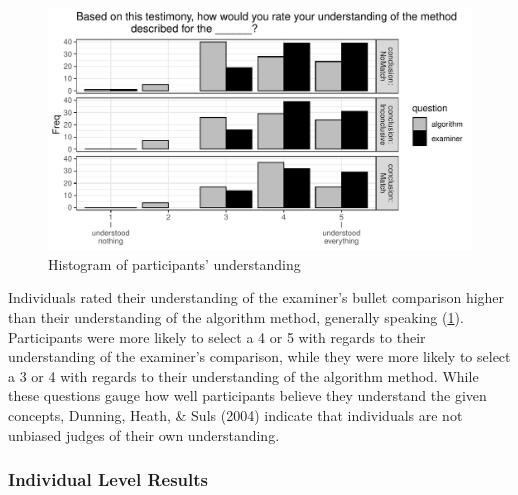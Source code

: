 \documentclass[print]{nuthesis}
\begin{document}
\begin{figure}

{\centering \includegraphics[width=\linewidth]{thesis_files/figure-latex/histunder-1} 

}

\caption{Histogram of participants' understanding}\label{fig:histunder}
\end{figure}

Individuals rated their understanding of the examiner's bullet comparison higher than their understanding of the algorithm method, generally speaking (\ref{fig:histunder}).
Participants were more likely to select a 4 or 5 with regards to their understanding of the examiner's comparison, while they were more likely to select a 3 or 4 with regards to their understanding of the algorithm method.
While these questions gauge how well participants believe they understand the given concepts, Dunning, Heath, \& Suls (2004) indicate that individuals are not unbiased judges of their own understanding.

\hypertarget{individual-level-results}{%
\subsubsection{Individual Level Results}\label{individual-level-results}}
\end{document}
